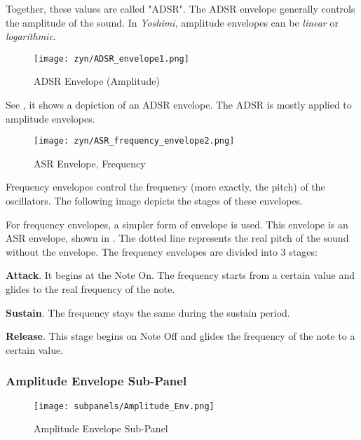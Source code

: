    Together, these values are called "ADSR".
   The ADSR envelope generally controls the amplitude of the sound.
   In \textsl{Yoshimi},
   amplitude envelopes can be \textsl{linear} or \textsl{logarithmic}.

\begin{figure}[H]
   \centering
   \texttt{[image: zyn/ADSR\_envelope1.png]}
   \caption{ADSR Envelope (Amplitude)}
   \label{fig:adsr_envelope_depiction}
\end{figure}

   See ,
   it shows a depiction of an ADSR envelope.
   The ADSR is mostly applied to amplitude envelopes.

\begin{figure}[H]
   \centering
   \texttt{[image: zyn/ASR\_frequency\_envelope2.png]}
   \caption{ASR Envelope, Frequency}
   \label{fig:asr_envelope_depiction}
\end{figure}

   Frequency envelopes control the frequency (more exactly, the pitch) of the
   oscillators. The following image depicts the stages of these envelopes.

   For frequency envelopes, a simpler form of envelope is used.
   This envelope is an ASR envelope, shown in
   .
   The dotted line represents the real pitch of the sound without the envelope.
   The frequency envelopes are divided into 3 stages:

   \begin{enumber}
      \item \textbf{Attack}.
      It begins at the Note On. The frequency starts from a certain value and
      glides to the real frequency of the note.
      \item \textbf{Sustain}.
      The frequency stays the same during the sustain period.
      \item \textbf{Release}.
      This stage begins on Note Off and glides the frequency of the note to a
      certain value.
   \end{enumber}

\subsubsection{Amplitude Envelope Sub-Panel}
\label{subsubsec:amplitude_envelope_subpanel}

\begin{figure}[H]
   \centering
   \texttt{[image: subpanels/Amplitude\_Env.png]}
   \caption[Amplitude Envelope Sub-Panel]{Amplitude Envelope Sub-Panel}
   \label{fig:amplitude_env}
\end{figure}

